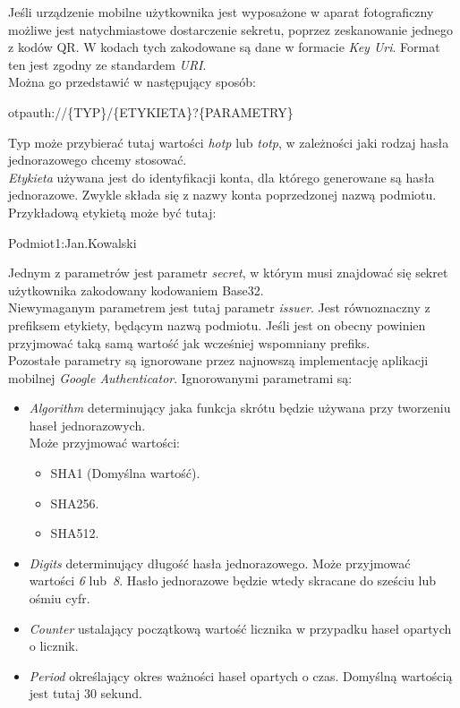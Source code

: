 Jeśli urządzenie mobilne użytkownika jest wyposażone w aparat fotograficzny możliwe jest natychmiastowe dostarczenie sekretu, 
poprzez zeskanowanie jednego z kodów QR.
W kodach tych zakodowane są dane w formacie \textit{Key Uri}. 
Format ten jest zgodny ze standardem \textit{URI}. \\
Można go przedstawić w następujący sposób: \\
\centerline{otpauth://\{TYP\}/\{ETYKIETA\}?\{PARAMETRY\}} 
Typ może przybierać tutaj wartości \textit{hotp} lub \textit{totp}, w zależności jaki rodzaj hasła jednorazowego chcemy stosować. \\
\textit{Etykieta} używana jest do identyfikacji konta, dla którego generowane są hasła jednorazowe. 
Zwykle składa się z nazwy konta poprzedzonej nazwą podmiotu. Przykładową etykietą może być tutaj: \\
\centerline{Podmiot1:Jan.Kowalski}
Jednym z parametrów jest parametr \textit{secret}, w którym musi znajdować się sekret użytkownika zakodowany kodowaniem Base32. \\
Niewymaganym parametrem jest tutaj parametr \textit{issuer}. Jest równoznaczny z prefiksem etykiety, będącym nazwą podmiotu. 
Jeśli jest on obecny powinien przyjmować taką samą wartość jak wcześniej wspomniany prefiks. \\
Pozostałe parametry są ignorowane przez najnowszą implementację aplikacji mobilnej \textit{Google Authenticator}.
Ignorowanymi parametrami są: 
\begin{itemize}
	\item \textit{Algorithm} determinujący jaka funkcja skrótu będzie używana przy tworzeniu haseł jednorazowych. \\
		Może przyjmować wartości: 
		\begin{itemize}
			\item SHA1 (Domyślna wartość).
			\item SHA256.
			\item SHA512.
		\end{itemize}
	\item \textit{Digits} determinujący długość hasła jednorazowego. Może przyjmować wartości \textit{6} lub~\textit{8}.
		Hasło jednorazowe będzie wtedy skracane do sześciu lub ośmiu cyfr.
	\item \textit{Counter} ustalający początkową wartość licznika w przypadku haseł opartych o licznik.
	\item \textit{Period} określający okres ważności haseł opartych o czas. Domyślną wartością jest tutaj 30 sekund. 
\end{itemize}
